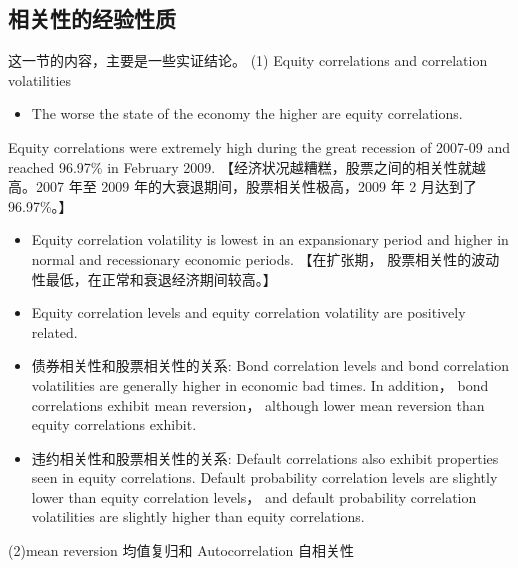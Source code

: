 \subsection{相关性的经验性质}


这一节的内容，主要是一些实证结论。 (1) Equity correlations and correlation volatilities

\begin{itemize}
\item The worse the state of the economy the higher are equity correlations.
\end{itemize}

Equity correlations were extremely high during the great recession of 2007-09 and reached 96.97\% in February 2009. 【经济状况越糟糕，股票之间的相关性就越高。2007 年至 2009 年的大衰退期间，股票相关性极高，2009 年 2 月达到了 96.97\%。】

\begin{itemize}
\item Equity correlation volatility is lowest in an expansionary period and higher in normal and recessionary economic periods. 【在扩张期， 股票相关性的波动性最低，在正常和衰退经济期间较高。】
\end{itemize}

\begin{itemize}
\item Equity correlation levels and equity correlation volatility are positively related.
\end{itemize}

\begin{itemize}
\item 债券相关性和股票相关性的关系: Bond correlation levels and bond correlation volatilities are generally higher in economic bad times. In addition， bond correlations exhibit mean reversion， although lower mean reversion than equity correlations exhibit.
\end{itemize}

\begin{itemize}
\item 违约相关性和股票相关性的关系: Default correlations also exhibit properties seen in equity correlations. Default probability correlation levels are slightly lower than equity correlation levels， and default probability correlation volatilities are slightly higher than equity correlations.
\end{itemize}

(2)mean reversion 均值复归和 Autocorrelation 自相关性

